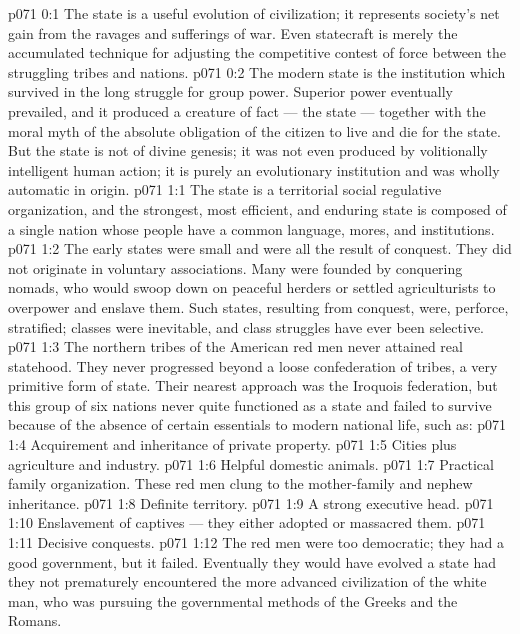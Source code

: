 \author{Melchizedek}
\vs p071 0:1 The state is a useful evolution of civilization; it represents society’s net gain from the ravages and sufferings of war. Even statecraft is merely the accumulated technique for adjusting the competitive contest of force between the struggling tribes and nations.
\vs p071 0:2 The modern state is the institution which survived in the long struggle for group power. Superior power eventually prevailed, and it produced a creature of fact --- the state --- together with the moral myth of the absolute obligation of the citizen to live and die for the state. But the state is not of divine genesis; it was not even produced by volitionally intelligent human action; it is purely an evolutionary institution and was wholly automatic in origin.
\vs p071 1:1 The state is a territorial social regulative organization, and the strongest, most efficient, and enduring state is composed of a single nation whose people have a common language, mores, and institutions.
\vs p071 1:2 The early states were small and were all the result of conquest. They did not originate in voluntary associations. Many were founded by conquering nomads, who would swoop down on peaceful herders or settled agriculturists to overpower and enslave them. Such states, resulting from conquest, were, perforce, stratified; classes were inevitable, and class struggles have ever been selective.
\vs p071 1:3 \pc The northern tribes of the American red men never attained real statehood. They never progressed beyond a loose confederation of tribes, a very primitive form of state. Their nearest approach was the Iroquois federation, but this group of six nations never quite functioned as a state and failed to survive because of the absence of certain essentials to modern national life, such as:
\vs p071 1:4 \bibnobreakspace Acquirement and inheritance of private property.
\vs p071 1:5 \bibnobreakspace Cities plus agriculture and industry.
\vs p071 1:6 \bibnobreakspace Helpful domestic animals.
\vs p071 1:7 \bibnobreakspace Practical family organization. These red men clung to the mother\hyp{}family and nephew inheritance.
\vs p071 1:8 \bibnobreakspace Definite territory.
\vs p071 1:9 \bibnobreakspace A strong executive head.
\vs p071 1:10 \bibnobreakspace Enslavement of captives --- they either adopted or massacred them.
\vs p071 1:11 \bibnobreakspace Decisive conquests.
\vs p071 1:12 \pc The red men were too democratic; they had a good government, but it failed. Eventually they would have evolved a state had they not prematurely encountered the more advanced civilization of the white man, who was pursuing the governmental methods of the Greeks and the Romans.
